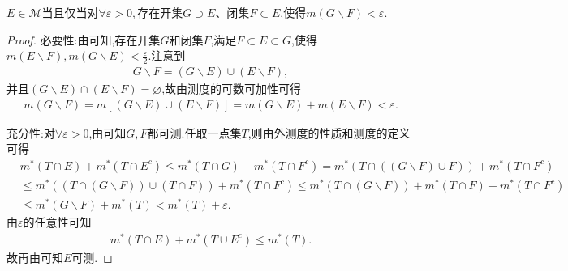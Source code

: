 \documentclass[../../main.tex]{subfiles}%
\begin{document}
\begin{corollary}\label{corollary:集合可测的充要条件2}
$E\in \mathscr{M}$当且仅当对$\forall \varepsilon>0,$存在开集$G\supset E$、闭集$F\subset E$,使得$m(G\backslash F)<\varepsilon.$
\end{corollary}
\begin{proof}

{\heiti 必要性:}由可知,存在开集$G$和闭集$F$,满足$F\subset E\subset G$,使得$m(E\backslash F),m(G\backslash E)<\frac{\varepsilon}{2}$.注意到
\begin{align*}
G\backslash F=(G\backslash E)\cup (E\backslash F),
\end{align*}
并且$(G\backslash E)\cap (E\backslash F)=\varnothing$,故由测度的可数可加性可得
\begin{align*}
m(G\backslash F)=m[(G\backslash E)\cup (E\backslash F)]=m(G\backslash E)+m(E\backslash F)<\varepsilon.
\end{align*}

{\heiti 充分性:}对$\forall \varepsilon>0$,由可知$G,F$都可测.任取一点集$T$,则由外测度的性质和测度的定义可得
\begin{align*}
&m^*\left( T\cap E \right) +m^*\left( T\cap E^c \right) \leqslant m^*\left( T\cap G \right) +m^*\left( T\cap F^c \right) =m^*(T\cap \left( \left( G\backslash F \right) \cup F \right) )+m^*\left( T\cap F^c \right) 
\\
&\leqslant m^*\left( \left( T\cap \left( G\backslash F \right) \right) \cup \left( T\cap F \right) \right) +m^*\left( T\cap F^c \right) \leqslant m^*\left( T\cap \left( G\backslash F \right) \right) +m^*\left( T\cap F \right) +m^*\left( T\cap F^c \right) 
\\
&\leqslant m^*\left( G\backslash F \right) +m^*\left( T \right) <m^*\left( T \right) +\varepsilon .
\end{align*}
由$\varepsilon$的任意性可知
\begin{align*}
m^*\left( T\cap E \right) +m^*\left( T\cup E^c \right) \leqslant m^*(T).
\end{align*}
故再由可知$E$可测.

\end{proof}
\end{document}
